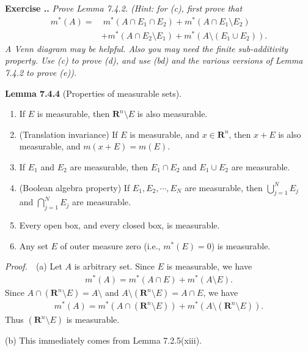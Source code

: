 \documentclass{book}
\newcommand{\pff}{\vspace{.25em}\noindent\emph{Proof.}~~}
\newcommand{\titl}[1]{\noindent\textbf{#1}}
\newcounter{Exercise}[section]
\renewcommand{\theExercise}{\thesection.\arabic{Exercise}.}
\newcommand{\new}{\vspace{1.5em}\noindent\textbf{Exercise \stepcounter{Exercise}\textbf{\theExercise}} }
\begin{document}
\new\emph{Prove Lemma 7.4.2. (Hint: for (c), first prove that}
    \begin{align*}
        m^*(A) =&~ m^*(A \cap E_1 \cap E_2) + m^*(A \cap E_1 \setminus E_2)\\
        &+ m^*(A \cap E_2 \setminus E_1) + m^*(A \setminus (E_1 \cup E_2)).
    \end{align*}
\emph{A Venn diagram may be helpful. Also you may need the finite sub-additivity property. Use (c) to prove (d), and use (bd) and the various versions of Lemma 7.4.2 to prove (e)).}

\begin{framed}
\titl{Lemma 7.4.4} (Properties of measurable sets).
\begin{enumerate}
    \item If $E$ is measurable, then $\mathbf{R}^n \setminus E$ is also measurable.
    \item (Translation invariance) If $E$ is measurable, and $x \in \mathbf{R}^n$, then $x + E$ is also measurable, and $m(x + E) = m(E)$.
    \item If $E_1$ and $E_2$ are measurable, then $E_1 \cap E_2$ and $E_1 \cup E_2$ are measurable.
    \item (Boolean algebra property) If $E_1, E_2, \cdots , E_N$ are measurable, then $\bigcup_{j = 1}^{N} E_j$ and $\bigcap_{j = 1}^{N} E_j$ are measurable.
    \item Every open box, and every closed box, is measurable.
    \item Any set $E$ of outer measure zero (i.e., $m^*(E) = 0$) is measurable.
\end{enumerate}
\end{framed}

\pff (a) Let $A$ is arbitrary set. Since $E$ is measurable, we have
    \begin{align*}
        m^*(A) = m^*(A \cap E) + m^*(A \setminus E).
    \end{align*}
Since $A \cap (\mathbf{R}^n \setminus E) = A \setminus$ and $A \setminus (\mathbf{R}^n \setminus E) = A \cap E$, we have
    \begin{align*}
        m^*(A) = m^*(A \cap (\mathbf{R}^n \setminus E)) + m^*(A \setminus (\mathbf{R}^n \setminus E)).
    \end{align*}
Thus $(\mathbf{R}^n \setminus E)$ is measurable.

(b) This immediately comes from Lemma 7.2.5(xiii).
\end{document}
